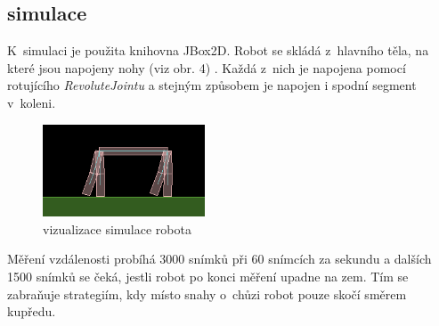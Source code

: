\documentclass[a4]{article}
\begin{document}
\subsection{simulace}
K~simulaci je použita knihovna JBox2D\cite{jbox2D}. Robot se skládá z~hlavního těla, na které jsou napojeny nohy (viz obr. 4) . Každá z~nich je napojena pomocí rotujícího \emph{RevoluteJointu} a stejným způsobem je napojen i spodní segment v~koleni.\par

\begin{figure}
  \begin{center}
    \includegraphics[width=0.43\textwidth]{robot}
  \end{center}
  \caption{vizualizace simulace robota}
\end{figure}

Měření vzdálenosti probíhá 3000 snímků při 60 snímcích za sekundu a dalších 1500 snímků se čeká, jestli robot po konci měření upadne na zem. Tím se zabraňuje strategiím, kdy místo snahy o~chůzi robot pouze skočí směrem kupředu.\par
\end{document}
